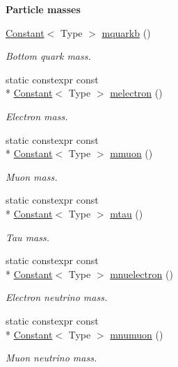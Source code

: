 \begin{Indent}{\bf Particle masses}
\begin{DoxyCompactItemize}
\hyperlink{exceptionmagrathea_1_1Constant}{Constant}$<$ Type $>$ \hyperlink{exceptionmagrathea_1_1Constants_a2353b31aa3d8b200fed48aa072864bde}{mquarkb} ()
\begin{DoxyCompactList}\small\item\em Bottom quark mass. \end{DoxyCompactList}\item 
static constexpr const \\*
\hyperlink{exceptionmagrathea_1_1Constant}{Constant}$<$ Type $>$ \hyperlink{exceptionmagrathea_1_1Constants_a86045de9b4462ecaf50e26950a859035}{melectron} ()
\begin{DoxyCompactList}\small\item\em Electron mass. \end{DoxyCompactList}\item 
static constexpr const \\*
\hyperlink{exceptionmagrathea_1_1Constant}{Constant}$<$ Type $>$ \hyperlink{exceptionmagrathea_1_1Constants_a0fb6ac9c0ae1c6879e4d3f3518702fd6}{mmuon} ()
\begin{DoxyCompactList}\small\item\em Muon mass. \end{DoxyCompactList}\item 
static constexpr const \\*
\hyperlink{exceptionmagrathea_1_1Constant}{Constant}$<$ Type $>$ \hyperlink{exceptionmagrathea_1_1Constants_a362cc5ee7d568b19718fda344a52a157}{mtau} ()
\begin{DoxyCompactList}\small\item\em Tau mass. \end{DoxyCompactList}\item 
static constexpr const \\*
\hyperlink{exceptionmagrathea_1_1Constant}{Constant}$<$ Type $>$ \hyperlink{exceptionmagrathea_1_1Constants_ab5d19e8bad438ebabdc09d1207d5ad74}{mnuelectron} ()
\begin{DoxyCompactList}\small\item\em Electron neutrino mass. \end{DoxyCompactList}\item 
static constexpr const \\*
\hyperlink{exceptionmagrathea_1_1Constant}{Constant}$<$ Type $>$ \hyperlink{exceptionmagrathea_1_1Constants_aefe169249a569f78a8db41609c431b7c}{mnumuon} ()
\begin{DoxyCompactList}\small\item\em Muon neutrino mass. \end{DoxyCompactList}\item 

\end{DoxyCompactItemize}
\end{Indent}
